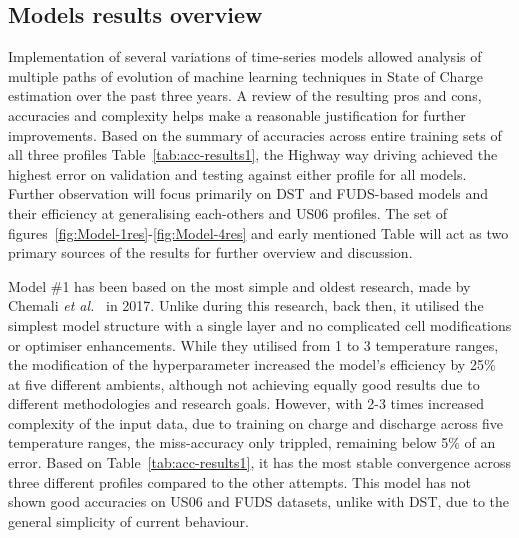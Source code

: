 %
%
\subsection{Models results overview}
Implementation of several variations of time-series models allowed analysis of multiple paths of evolution of machine learning techniques in State of Charge estimation over the past three years.
A review of the resulting pros and cons, accuracies and complexity helps make a reasonable justification for further improvements.
Based on the summary of accuracies across entire training sets of all three profiles Table~\ref{tab:acc-results1}, the Highway way driving achieved the highest error on validation and testing against either profile for all models.
Further observation will focus primarily on DST and FUDS-based models and their efficiency at generalising each-others and US06 profiles.
The set of figures~\ref{fig:Model-1res}-\ref{fig:Model-4res} and early mentioned Table will act as two primary sources of the results for further overview and discussion.

%
%
Model \#1 has been based on the most simple and oldest research, made by Chemali \textit{et al.}~\cite{Chemali2017} in 2017.
Unlike during this research, back then, it utilised the simplest model structure with a single layer and no complicated cell modifications or optimiser enhancements.
While they utilised from 1 to 3 temperature ranges, the modification of the hyperparameter increased the model's efficiency by 25\% at five different ambients, although not achieving equally good results due to different methodologies and research goals.
However, with 2-3 times increased complexity of the input data, due to training on charge and discharge across five temperature ranges, the miss-accuracy only trippled, remaining below 5\% of an error.
Based on Table~\ref{tab:acc-results1}, it has the most stable convergence across three different profiles compared to the other attempts.
This model has not shown good accuracies on US06 and FUDS datasets, unlike with DST, due to the general simplicity of current behaviour.


